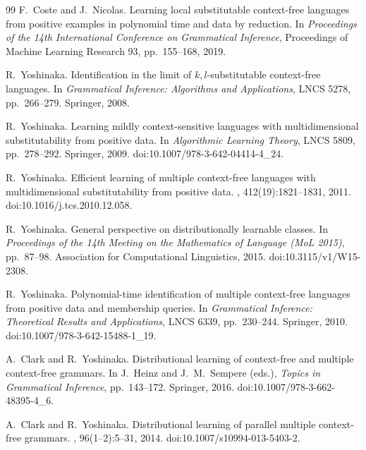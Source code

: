 \begin{thebibliography}{99}
F.~Coste and J.~Nicolas.
\newblock Learning local substitutable context-free languages from positive
examples in polynomial time and data by reduction.
\newblock In {\em Proceedings of the 14th International Conference on
Grammatical Inference}, Proceedings of Machine Learning Research 93,
pp.~155--168, 2019.

R.~Yoshinaka.
\newblock Identification in the limit of $k,l$-substitutable context-free
languages.
\newblock In {\em Grammatical Inference: Algorithms and Applications},
LNCS 5278, pp.~266--279. Springer, 2008.

R.~Yoshinaka.
\newblock Learning mildly context-sensitive languages with multidimensional
 substitutability from positive data.
\newblock In {\em Algorithmic Learning Theory}, LNCS 5809, pp.~278--292.
 Springer, 2009.
\newblock doi:10.1007/978-3-642-04414-4\_24.

R.~Yoshinaka.
\newblock Efficient learning of multiple context-free languages with
multidimensional substitutability from positive data.
, 412(19):1821--1831, 2011.
\newblock doi:10.1016/j.tcs.2010.12.058.

R.~Yoshinaka.
\newblock General perspective on distributionally learnable classes.
\newblock In \emph{Proceedings of the 14th Meeting on the Mathematics
of Language (MoL 2015)}, pp.~87--98.
Association for Computational Linguistics, 2015.
\newblock doi:10.3115/v1/W15-2308.

R.~Yoshinaka.
\newblock Polynomial-time identification of multiple context-free languages
from positive data and membership queries.
\newblock In {\em Grammatical Inference: Theoretical Results and Applications},
LNCS 6339, pp.~230--244. Springer, 2010.
\newblock doi:10.1007/978-3-642-15488-1\_19.

A.~Clark and R.~Yoshinaka.
\newblock Distributional learning of context-free and multiple context-free grammars.
\newblock In J.~Heinz and J.~M.~Sempere (eds.), \emph{Topics in Grammatical
Inference}, pp.~143--172. Springer, 2016.
\newblock doi:10.1007/978-3-662-48395-4\_6.

A.~Clark and R.~Yoshinaka.
\newblock Distributional learning of parallel multiple context-free grammars.
, 96(1--2):5--31, 2014.
\newblock doi:10.1007/s10994-013-5403-2.


\end{thebibliography}

